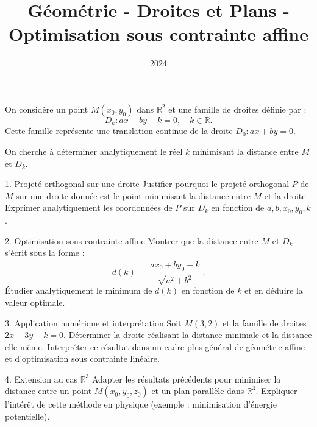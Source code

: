 \documentclass[10pt,a4paper]{article}
\title{Géométrie - Droites et Plans - Optimisation sous contrainte affine}
\author{}
\date{2024}
\begin{document}
\maketitle

On considère un point $M(x_0, y_0)$ dans $\mathbb{R}^2$ et une famille de droites définie par :
$$
D_k : ax + by + k = 0, \quad k \in \mathbb{R}.
$$
Cette famille représente une translation continue de la droite $D_0 : ax + by = 0$.

On cherche à déterminer analytiquement le réel $k$ minimisant la distance entre $M$ et $D_k$.


1. Projeté orthogonal sur une droite
  \ql Justifier pourquoi le projeté orthogonal $P$ de $M$ sur une droite donnée est le point minimisant la distance entre $M$ et la droite.
  \ql Exprimer analytiquement les coordonnées de $P$ sur $D_k$ en fonction de $a, b, x_0, y_0, k$.

2. Optimisation sous contrainte affine
  \ql Montrer que la distance entre $M$ et $D_k$ s'écrit sous la forme :
   $$
   d(k) = \frac{|ax_0 + by_0 + k|}{\sqrt{a^2 + b^2}}.
   $$
  \ql Étudier analytiquement le minimum de $d(k)$ en fonction de $k$ et en déduire la valeur optimale.

3. Application numérique et interprétation
  \ql Soit $M(3,2)$ et la famille de droites $2x - 3y + k = 0$. Déterminer la droite réalisant la distance minimale et la distance elle-même.
  \ql Interpréter ce résultat dans un cadre plus général de géométrie affine et d'optimisation sous contrainte linéaire.

4. Extension au cas $\mathbb{R}^3$
  \ql Adapter les résultats précédents pour minimiser la distance entre un point $M(x_0, y_0, z_0)$ et un plan parallèle dans $\mathbb{R}^3$.
  \ql Expliquer l'intérêt de cette méthode en physique (exemple : minimisation d'énergie potentielle).
\end{document}
